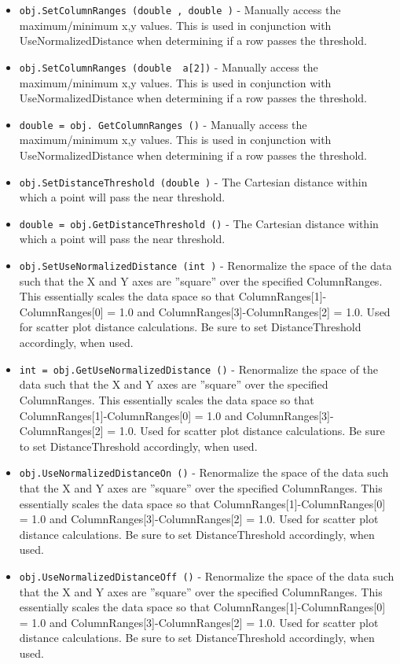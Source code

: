 \begin{itemize}
\item  \verb|obj.SetColumnRanges (double , double )| -  Manually access the maximum/minimum x,y values.  This is used in 
 conjunction with UseNormalizedDistance when determining if a row
 passes the threshold.

\item  \verb|obj.SetColumnRanges (double  a[2])| -  Manually access the maximum/minimum x,y values.  This is used in 
 conjunction with UseNormalizedDistance when determining if a row
 passes the threshold.

\item  \verb|double = obj. GetColumnRanges ()| -  Manually access the maximum/minimum x,y values.  This is used in 
 conjunction with UseNormalizedDistance when determining if a row
 passes the threshold.

\item  \verb|obj.SetDistanceThreshold (double )| -  The Cartesian distance within which a point will pass the near threshold.

\item  \verb|double = obj.GetDistanceThreshold ()| -  The Cartesian distance within which a point will pass the near threshold.

\item  \verb|obj.SetUseNormalizedDistance (int )| -  Renormalize the space of the data such that the X and Y axes are
 ''square'' over the specified ColumnRanges.  This essentially scales
 the data space so that ColumnRanges[1]-ColumnRanges[0] = 1.0 and 
 ColumnRanges[3]-ColumnRanges[2] = 1.0.  Used for scatter plot distance
 calculations.  Be sure to set DistanceThreshold accordingly, when used.

\item  \verb|int = obj.GetUseNormalizedDistance ()| -  Renormalize the space of the data such that the X and Y axes are
 ''square'' over the specified ColumnRanges.  This essentially scales
 the data space so that ColumnRanges[1]-ColumnRanges[0] = 1.0 and 
 ColumnRanges[3]-ColumnRanges[2] = 1.0.  Used for scatter plot distance
 calculations.  Be sure to set DistanceThreshold accordingly, when used.

\item  \verb|obj.UseNormalizedDistanceOn ()| -  Renormalize the space of the data such that the X and Y axes are
 ''square'' over the specified ColumnRanges.  This essentially scales
 the data space so that ColumnRanges[1]-ColumnRanges[0] = 1.0 and 
 ColumnRanges[3]-ColumnRanges[2] = 1.0.  Used for scatter plot distance
 calculations.  Be sure to set DistanceThreshold accordingly, when used.

\item  \verb|obj.UseNormalizedDistanceOff ()| -  Renormalize the space of the data such that the X and Y axes are
 ''square'' over the specified ColumnRanges.  This essentially scales
 the data space so that ColumnRanges[1]-ColumnRanges[0] = 1.0 and 
 ColumnRanges[3]-ColumnRanges[2] = 1.0.  Used for scatter plot distance
 calculations.  Be sure to set DistanceThreshold accordingly, when used.

\end{itemize}
